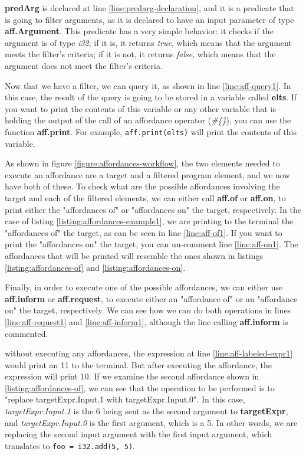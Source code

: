 \documentclass[11pt,fleqn,openany]{book} %
\begin{document}
\textbf{predArg} is declared at line \ref{line:predarg-declaration}, and it is a predicate that is going to filter arguments, as it is declared to have an input parameter of type \textbf{aff.Argument}. This predicate has a very simple behavior: it checks if the argument is of type \emph{i32}; if it is, it returns \emph{true}, which means that the argument meets the filter's criteria; if it is not, it returns \emph{false}, which means that the argument does not meet the filter's criteria.

Now that we have a filter, we can query it, as shown in line \ref{line:aff-query1}. In this case, the result of the query is going to be stored in a variable called \textbf{elts}. If you want to print the contents of this variable or any other variable that is holding the output of the call of an affordance operator (\emph{\#\{\}}), you can use the function \textbf{aff.print}. For example, \lstinline{aff.print(elts)} will print the contents of this variable.

As shown in figure \ref{figure:affordances-workflow}, the two elements needed to execute an affordance are a target and a filtered program element, and we now have both of these. To check what are the possible affordances involving the target and each of the filtered elements, we can either call \textbf{aff.of} or \textbf{aff.on}, to print either the "affordances of" or "affordances on" the target, respectively. In the case of listing \ref{listing:affordances-example1}, we are printing to the terminal the "affordances of" the target, as can be seen in line \ref{line:aff-of1}. If you want to print the "affordances on" the target, you can un-comment line \ref{line:aff-on1}. The affordances that will be printed will resemble the ones shown in listings \ref{listing:affordances-of} and \ref{listing:affordances-on}.

Finally, in order to execute one of the possible affordances, we can either use \textbf{aff.inform} or \textbf{aff.request}, to execute either an "affordance of" or an "affordance on" the target, respectively. We can see how we can do both operations in lines \ref{line:aff-request1} and \ref{line:aff-inform1}, although the line calling \textbf{aff.inform} is commented.

without executing any affordances, the expression at line \ref{line:aff-labeled-expr1} would print an 11 to the terminal. But after executing the affordance, the expression will print 10. If we examine the second affordance shown in \ref{listing:affordances-of}, we can see that the operation to be performed is to "replace targetExpr.Input.1 with targetExpr.Input.0". In this case, \emph{targetExpr.Input.1} is the 6 being sent as the second argument to \textbf{targetExpr}, and \emph{targetExpr.Input.0} is the first argument, which is a 5. In other words, we are replacing the second input argument with the first input argument, which translates to \lstinline{foo = i32.add(5, 5)}.
\end{document}
